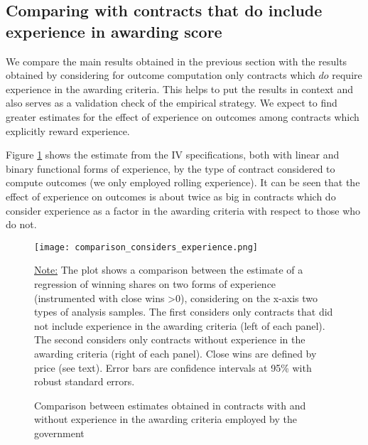 



\clearpage

\subsection{Comparing with contracts that do include experience in awarding score}

We compare the main results obtained in the previous section with the results obtained by considering for outcome computation only contracts which $do$ require experience in the awarding criteria. This helps to put the results in context and also serves as a validation check of the empirical strategy. We expect to find greater estimates for the effect of experience on outcomes among contracts which explicitly reward experience.

Figure \ref{fig:comparison_considers_experience} shows the estimate from the IV specifications, both with linear and binary functional forms of experience, by the type of contract considered to compute outcomes (we only employed rolling experience). It can be seen that the effect of experience on outcomes is about twice as big in contracts which do consider experience as a factor in the awarding criteria with respect to those who do not.

\begin{figure}[H]
  \caption{Comparison between estimates obtained in contracts with and without experience in the awarding criteria employed by the government}
  \texttt{[image: comparison\_considers\_experience.png]}

  \vskip 0.5mm
  {\noindent\justifying\footnotesize\underline{Note:} The plot shows a comparison between the estimate of a regression of winning shares on two forms of experience (instrumented with close wins >0), considering on the x-axis two types of analysis samples. The first considers only contracts that did not include experience in the awarding criteria (left of each panel). The second considers only contracts without experience in the awarding criteria (right of each panel). Close wins are defined by price (see text). Error bars are confidence intervals at 95\% with robust standard errors. \par}
  \label{fig:comparison_considers_experience}
\end{figure}


